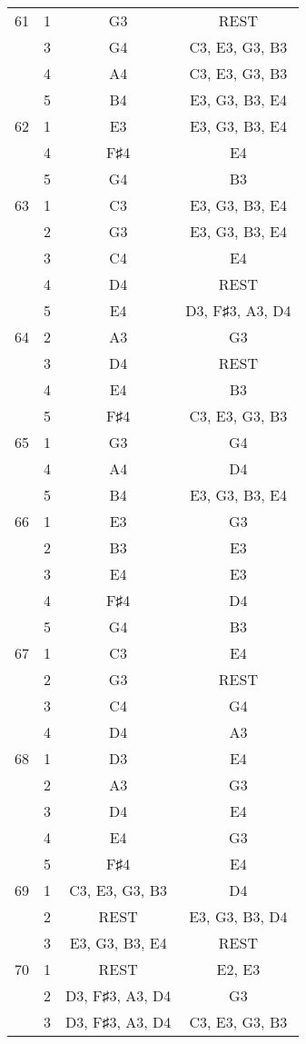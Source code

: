 \documentclass{article}
\begin{document}
\begin{longtable}{|c|c|c|c|}
\hline
61 & 1 & G3 & REST \\ 
  & 3 & G4 & C3, E3, G3, B3 \\ 
  & 4 & A4 & C3, E3, G3, B3 \\ 
  & 5 & B4 & E3, G3, B3, E4 \\ 
\hline
62 & 1 & E3 & E3, G3, B3, E4 \\ 
  & 4 & F♯4 & E4 \\ 
  & 5 & G4 & B3 \\ 
\hline
63 & 1 & C3 & E3, G3, B3, E4 \\ 
  & 2 & G3 & E3, G3, B3, E4 \\ 
  & 3 & C4 & E4 \\ 
  & 4 & D4 & REST \\ 
  & 5 & E4 & D3, F♯3, A3, D4 \\ 
\hline
64 & 2 & A3 & G3 \\ 
  & 3 & D4 & REST \\ 
  & 4 & E4 & B3 \\ 
  & 5 & F♯4 & C3, E3, G3, B3 \\ 
\hline
65 & 1 & G3 & G4 \\ 
  & 4 & A4 & D4 \\ 
  & 5 & B4 & E3, G3, B3, E4 \\ 
\hline
66 & 1 & E3 & G3 \\ 
  & 2 & B3 & E3 \\ 
  & 3 & E4 & E3 \\ 
  & 4 & F♯4 & D4 \\ 
  & 5 & G4 & B3 \\ 
\hline
67 & 1 & C3 & E4 \\ 
  & 2 & G3 & REST \\ 
  & 3 & C4 & G4 \\ 
  & 4 & D4 & A3 \\ 
\hline
68 & 1 & D3 & E4 \\ 
  & 2 & A3 & G3 \\ 
  & 3 & D4 & E4 \\ 
  & 4 & E4 & G3 \\ 
  & 5 & F♯4 & E4 \\ 
\hline
69 & 1 & C3, E3, G3, B3 & D4 \\ 
  & 2 & REST & E3, G3, B3, D4 \\ 
  & 3 & E3, G3, B3, E4 & REST \\ 
\hline
70 & 1 & REST & E2, E3 \\ 
  & 2 & D3, F♯3, A3, D4 & G3 \\ 
  & 3 & D3, F♯3, A3, D4 & C3, E3, G3, B3 \\ 

\end{longtable}
\end{document}
